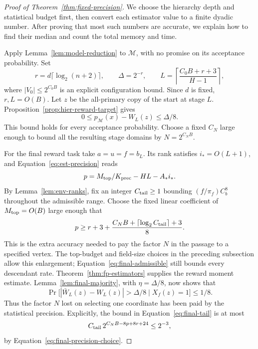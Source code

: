 \begin{proof}[Proof of Theorem~\ref{thm:fixed-precision}]
We choose the hierarchy depth and statistical budget first, then convert each estimator value to a finite dyadic number. After proving that most such numbers are accurate, we explain how to find their median and count the total memory and time.

Apply Lemma~\ref{lem:model-reduction} to $\mathcal M$, with no promise
on its acceptance probability. Set
\[
 r=d\lceil\log_2(n+2)\rceil,\qquad \Delta=2^{-r},\qquad
 L=\left\lceil\frac{C_0B+r+3}{H-1}\right\rceil,
\]
where $|V_0|\le2^{C_0B}$ is an explicit configuration bound.
Since $d$ is fixed, $r,L=O(B)$. Let $z$ be the all-primary copy of
the start at stage $L$. Proposition~\ref{prop:hier-reward-target}
gives
\begin{equation}\label{eq:final-hierarchy-accuracy}
 0\le p_{\mathcal M}(x)-W_L(z)\le\Delta/8.
\end{equation}
This bound holds for every acceptance probability. Choose a fixed
$C_N$ large enough to bound all the resulting stage domains by
$N=2^{C_NB}$.

For the final reward task take $a=u=f=b_L$. Its rank satisfies
$i_*=O(L+1)$, and Equation~\eqref{eq:est-precision} reads
\[
 p=M_{\rm top}/K_{\rm prec}-HL-A_*i_*.
\]
By Lemma~\ref{lem:env-ranks}, fix an integer $C_{\rm tail}\ge1$ bounding
$(f/\pi_f)C_b^8$ throughout the admissible range. Choose the fixed
linear coefficient of $M_{\rm top}=O(B)$ large enough that
\begin{equation}\label{eq:final-precision-choice}
 p\ge r+3+\frac{C_NB+\lceil\log_2 C_{\rm tail}\rceil+3}{8}.
\end{equation}
This is the extra accuracy needed to pay the factor $N$ in the passage to a specified vertex. The top-budget and field-size choices in the preceding subsection allow this enlargement; Equation~\eqref{eq:final-admissible} still
bounds every descendant rate. Theorem~\ref{thm:fp-estimators}
supplies the reward moment estimate. Lemma~\ref{lem:final-majority},
with $\eta=\Delta/8$, now shows that
\begin{equation}\label{eq:final-good-environments}
 \Pr\bigl[|\bar W_L(z)-W_L(z)|>\Delta/8
       \mid X_f(z)=1\bigr]\le1/8.
\end{equation}
Thus the factor $N$ lost on selecting one coordinate has been paid
by the statistical precision. Explicitly, the bound in
Equation~\eqref{eq:final-tail} is at most
\[
 C_{\rm tail}\,2^{C_NB-8p+8r+24}\le 2^{-3},
\]
by Equation~\eqref{eq:final-precision-choice}.


\end{proof}
